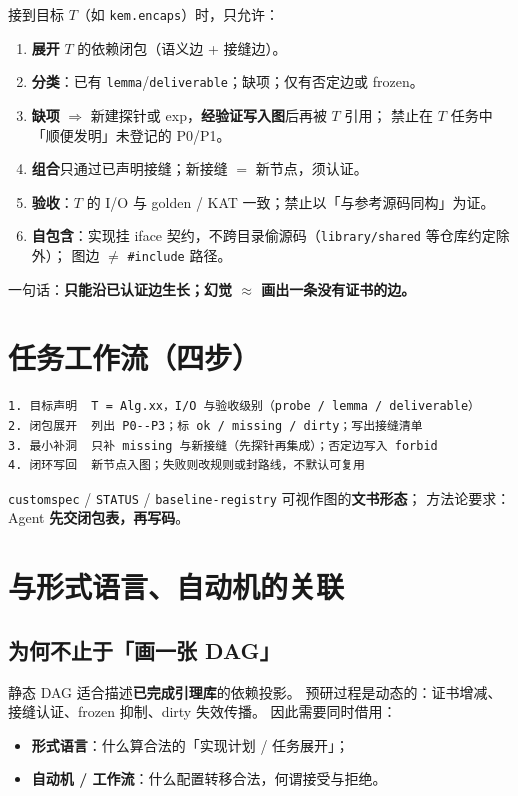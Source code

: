 \documentclass[UTF8,a4paper,11pt]{ctexart}
\begin{document}
接到目标 $T$（如 \texttt{kem.encaps}）时，只允许：
\begin{enumerate}
  \item \textbf{展开} $T$ 的依赖闭包（语义边 + 接缝边）。
  \item \textbf{分类}：已有 \texttt{lemma}/\texttt{deliverable}；缺项；仅有否定边或 frozen。
  \item \textbf{缺项} $\Rightarrow$ 新建探针或 exp，\textbf{经验证写入图}后再被 $T$ 引用；
        禁止在 $T$ 任务中「顺便发明」未登记的 P0/P1。
  \item \textbf{组合}只通过已声明接缝；新接缝 $=$ 新节点，须认证。
  \item \textbf{验收}：$T$ 的 I/O 与 golden / KAT 一致；禁止以「与参考源码同构」为证。
  \item \textbf{自包含}：实现挂 iface 契约，不跨目录偷源码（\texttt{library/shared} 等仓库约定除外）；
        图边 $\neq$ \texttt{\#include} 路径。
\end{enumerate}

一句话：\textbf{只能沿已认证边生长；幻觉 $\approx$ 画出一条没有证书的边。}

\section{任务工作流（四步）}

\begin{lstlisting}
1. 目标声明  T = Alg.xx，I/O 与验收级别（probe / lemma / deliverable）
2. 闭包展开  列出 P0--P3；标 ok / missing / dirty；写出接缝清单
3. 最小补洞  只补 missing 与新接缝（先探针再集成）；否定边写入 forbid
4. 闭环写回  新节点入图；失败则改规则或封路线，不默认可复用
\end{lstlisting}

\texttt{customspec} / \texttt{STATUS} / \texttt{baseline-registry} 可视作图的\textbf{文书形态}；
方法论要求：Agent \textbf{先交闭包表，再写码}。

\section{与形式语言、自动机的关联}

\subsection{为何不止于「画一张 DAG」}
静态 DAG 适合描述\textbf{已完成引理库}的依赖投影。
预研过程是动态的：证书增减、接缝认证、frozen 抑制、dirty 失效传播。
因此需要同时借用：
\begin{itemize}
  \item \textbf{形式语言}：什么算合法的「实现计划 / 任务展开」；
  \item \textbf{自动机 / 工作流}：什么配置转移合法，何谓接受与拒绝。
\end{itemize}
\end{document}
